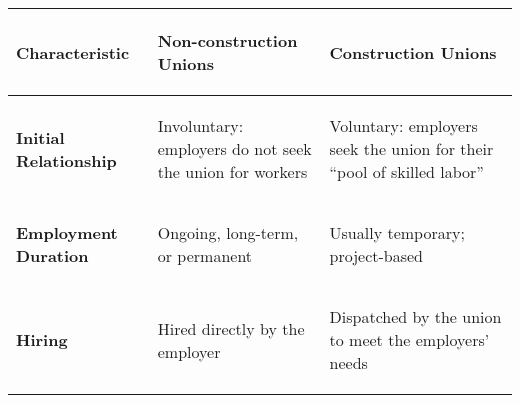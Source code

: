 \documentclass[12pt]{article}
\begin{document}
\begin{landscape}

\begin{table}
\begin{tabular}{|p{30mm}|p{87mm}|p{87mm}|}
\hline

\begin{center} \textbf{Characteristic} \end{center} & %
\begin{center}\textbf{Non-construction Unions}\end{center} & %
\begin{center}\textbf{Construction Unions}\end{center} \\	%
\hline

\begin{center}\textbf{Initial Relationship}\end{center} &	%
\begin{center}\begin{flushleft}Involuntary: employers do not seek the union for workers\end{flushleft}\end{center} &	%
\begin{center}\begin{flushleft}Voluntary: employers seek the union for their “pool of skilled labor”\end{flushleft}\end{center} \\ %
\hline

\begin{center}\textbf{Employment Duration}\end{center} &	%
\begin{center}\begin{flushleft}Ongoing, long-term, or permanent\end{flushleft}\end{center} &	%
\begin{center}\begin{flushleft}Usually temporary; project-based\end{flushleft}\end{center} \\ %
\hline

\begin{center} \textbf{Hiring} \end{center} &	%
\begin{center}\begin{flushleft} Hired directly by the employer \end{flushleft}\end{center} &	%
\begin{center}\begin{flushleft} Dispatched by the union to meet the employers' needs \end{flushleft}\end{center} \\ %
\hline


\end{tabular}
\end{table}
\end{landscape}
\end{document}
